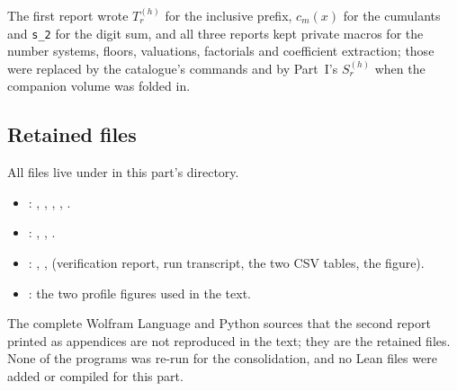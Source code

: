 \documentclass[11pt,oneside]{article}
\numberwithin{equation}{section}
\theoremstyle{definition}
\theoremstyle{remark}
\begin{document}
The first report wrote $T_r^{(h)}$ for the inclusive prefix, $c_m(x)$ for the
cumulants and \texttt{s\_2} for the digit sum, and all three reports kept
private macros for the number systems, floors, valuations, factorials and
coefficient extraction; those were replaced by the catalogue's commands and by
Part~I's $S_r^{(h)}$ when the companion volume was folded in.

\subsection{Retained files}
All files live under  in this part's directory.
\begin{itemize}
\item {}: ,
, ,
, .
\item {}: ,
, .
\item {}: ,
,  (verification report,
run transcript, the two CSV tables, the figure).
\item {}: the two profile figures used in the text.
\end{itemize}
The complete Wolfram Language and Python sources that the second report
printed as appendices are not reproduced in the text; they are the retained
files.  None of the programs was re-run for the consolidation, and no Lean
files were added or compiled for this part.
\end{document}

